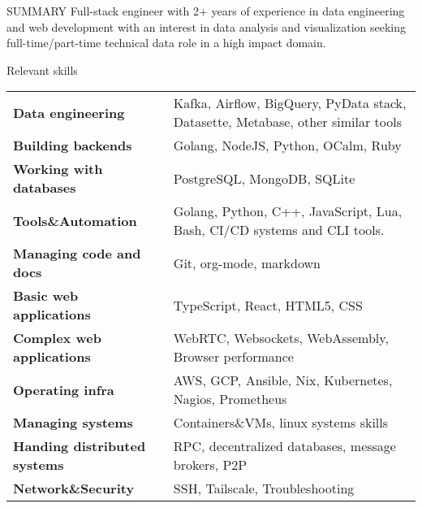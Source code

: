 \documentclass{resume} %
\begin{document}

\begin{rSection}{SUMMARY}
  {Full-stack engineer with 2+ years of experience in data engineering and web development with an interest in data analysis and visualization seeking full-time/part-time technical data role in a high impact domain.}
\end{rSection}

\begin{rSection}{Relevant skills}
  \begin{tabular}{ @{} >{\bfseries}l @{\hspace{6ex}} l }
    Data engineering & Kafka, Airflow, BigQuery, PyData stack, Datasette, Metabase, other similar tools\\
    Building backends & Golang, NodeJS, Python, OCalm, Ruby\\
    Working with databases & PostgreSQL, MongoDB, SQLite\\
    Tools\&Automation & Golang, Python, C++, JavaScript, Lua, Bash, CI/CD systems and CLI tools.\\
    Managing code and docs & Git, org-mode, markdown\\
    Basic web applications & TypeScript, React, HTML5, CSS\\
    Complex web applications & WebRTC, Websockets, WebAssembly, Browser performance\\
    Operating infra & AWS, GCP, Ansible, Nix, Kubernetes, Nagios, Prometheus\\
    Managing systems & Containers\&VMs, linux systems skills\\
    Handing distributed systems & RPC, decentralized databases, message brokers, P2P\\
    Network\&Security & SSH, Tailscale, Troubleshooting\\
  \end{tabular}\
\end{rSection}
\end{document}
